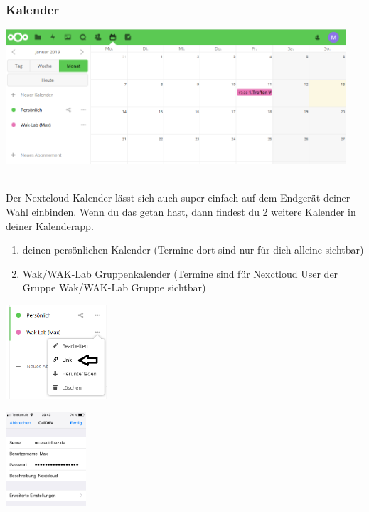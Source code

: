 \subsubsection{Kalender}
\begin{minipage}[t]{\textwidth}
  \centering
  \includegraphics[height=5cm]{pictures/NextcloudKalender.png}
  \label{img:NextcloudKalender}
\end{minipage}
\ \\
Der Nextcloud Kalender lässt sich auch super einfach auf dem Endgerät deiner Wahl einbinden. Wenn du das getan hast, dann findest du 2 weitere Kalender in deiner Kalenderapp.\\
\begin{enumerate}
  \item deinen persönlichen Kalender (Termine dort sind nur für dich alleine sichtbar)
  \item Wak/WAK-Lab Gruppenkalender (Termine sind für Nexctloud User der Gruppe Wak/WAK-Lab Gruppe sichtbar)
\end{enumerate}

\begin{minipage}[t]{0.5\textwidth}
  \centering
  \includegraphics[height=3.5cm]{pictures/NextcloudKalenderLink.png}
  \label{img:NextcloudKalenderLink}
\end{minipage}
\begin{minipage}[t]{0.5\textwidth}
  \centering
  \includegraphics[height=3.5cm]{pictures/AppleKalender.jpg}
  \label{img:AppleKalender}
\end{minipage}
\ \\


